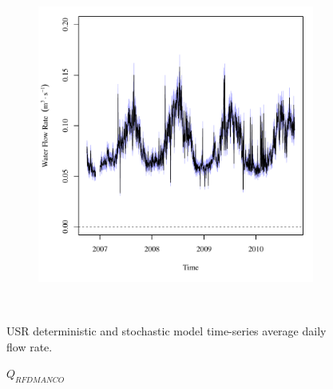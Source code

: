 \begin{linenumbers}
\begin{landscape}
\begin{figure}
\begin{subfigure}{0.7\textwidth}
		\end{subfigure}%
		\begin{subfigure}{0.7\textwidth}
			\centering
			\includegraphics[width=\tableCustomSize]{"Figures/Results_USR/Stochastic/Q WTP"}
		\end{subfigure}\\
		\caption{USR deterministic and stochastic model time-series average daily flow rate.}
	\end{figure}
\end{landscape}
\subfiguremid
\begin{landscape}
	\begin{figure}
		\centering
		$ Q_{RFDMANCO} $
		\begin{subfigure}{0.7\textwidth}
			\centering

\end{subfigure}
\end{figure}
\end{landscape}
\end{linenumbers}
